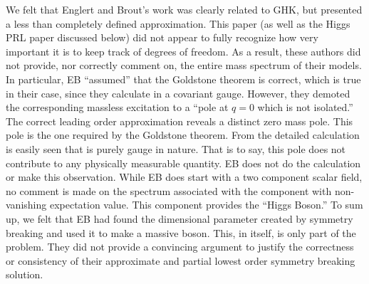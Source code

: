 \documentclass[12pt]{article}
\begin{document}
  We felt that Englert and Brout's work \cite{eb;1964} was clearly related to
  GHK, but presented a less than completely defined approximation. This paper
  (as well as the Higgs PRL paper discussed below) did not appear to fully
  recognize how very important it is to keep track of degrees of freedom. As a
  result, these authors did not provide, nor correctly comment on, the entire
  mass spectrum of their models. In particular, EB ``assumed'' that the
  Goldstone theorem is correct, which is true in their case, since they
  calculate in a covariant gauge. However, they demoted the corresponding
  massless excitation to a ``pole at $q=0$ which is not isolated.'' The
  correct leading order approximation reveals a distinct zero mass pole. This
  pole is the one required by the Goldstone theorem. From the detailed
  calculation is easily seen that is purely gauge in nature. That is to say,
  this pole does not contribute to any physically measurable quantity. EB does
  not do the calculation or make this observation. While EB does start with a
  two component scalar field, no comment is made on the spectrum associated
  with the component with non-vanishing expectation value. This component
  provides the ``Higgs Boson.'' To sum up, we felt that EB had found the
  dimensional parameter created by symmetry breaking and used it to make a
  massive boson. This, in itself, is only part of the problem. They did not
  provide a convincing argument to justify the correctness or consistency of
  their approximate and partial lowest order symmetry breaking solution.
\end{document}
